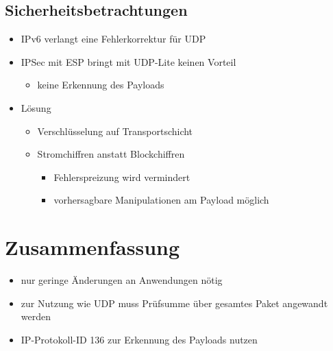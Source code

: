 \documentclass{beamer}
\begin{document}
\subsection{Sicherheitsbetrachtungen}
\begin{frame}
\begin{itemize}
\item IPv6 verlangt eine Fehlerkorrektur für UDP
\end{itemize}
\begin{itemize}
\item IPSec mit ESP bringt mit UDP-Lite keinen Vorteil
	\begin{itemize}
	\item keine Erkennung des Payloads
	\end{itemize}
\end{itemize}
\begin{itemize}
\item Lösung
	\begin{itemize}
	\item Verschlüsselung auf Transportschicht
	\item Stromchiffren anstatt Blockchiffren
		\begin{itemize}
		\item Fehlerspreizung wird vermindert
		\item vorhersagbare Manipulationen am Payload möglich
		\end{itemize}
	\end{itemize}
\end{itemize}
\end{frame}



\section{Zusammenfassung}

\begin{frame}

\begin{itemize}
\item nur geringe Änderungen an Anwendungen nötig
\end{itemize}

\begin{itemize}
\item zur Nutzung wie UDP muss Prüfsumme über gesamtes Paket angewandt werden
\end{itemize}

\begin{itemize}
\item IP-Protokoll-ID 136 zur Erkennung des Payloads nutzen
\end{itemize}

\end{frame}
\end{document}
